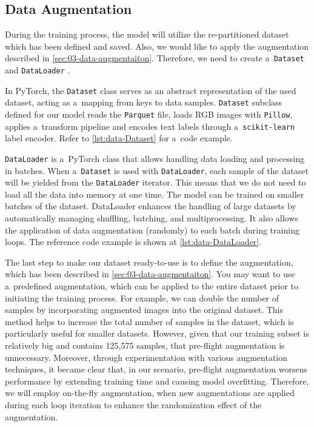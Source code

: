 \subsection*{Data Augmentation}
\label{sec:augmentation-data}

During the training process, the model will utilize the re-partitioned dataset which has been defined and saved. Also, we would like to apply the augmentation described in \autoref{sec:03-data-augmentaiton}. Therefore, we need to create a~\texttt{Dataset} and \texttt{DataLoader} \cite{siddiqui2025mastering}. 

In PyTorch, the \texttt{Dataset} class serves as an abstract representation of the used dataset, acting as a~mapping from keys to data samples. \texttt{Dataset} subclass defined for our model reads the \texttt{Parquet} file, loads RGB images with \texttt{Pillow},  applies a~transform pipeline and encodes text labels through a~\texttt{scikit‑learn} label encoder. Refer to \autoref{lst:data-Dataset} for a~code example.

\texttt{DataLoader} is a~PyTorch class that allows handling data loading and processing in batches. When a~\texttt{Dataset} is used with \texttt{DataLoader}, each sample of the dataset will be yielded from the \texttt{DataLoader} iterator. This means that we do not need to load all the data into memory at one time. The model can be trained on smaller batches of the dataset. DataLoader enhances the handling of large datasets by automatically managing shuffling, batching, and multiprocessing. It also allows the application of data augmentation (randomly) to each batch during training loops. The reference code example is shown at \autoref{lst:data-DataLoader}.

The last step to make our dataset ready-to-use is to define the augmentation, which has been described in \autoref{sec:03-data-augmentaiton}. You may want to use a~predefined augmentation, which can be applied to the entire dataset prior to initiating the training process. For example, we can double the number of samples by incorporating augmented images into the original dataset. This method helps to increase the total number of samples in the dataset, which is particularly useful for smaller datasets. However, given that our training subset is relatively big and contains 125,575 samples, that pre-flight augmentation is unnecessary. Moreover, through experimentation with various augmentation techniques, it became clear that, in our scenario, pre-flight augmentation worsens performance by extending training time and causing model overfitting. Therefore, we will employ on-the-fly augmentation, when new augmentations are applied during each loop iteration to enhance the randomization effect of the augmentation.

